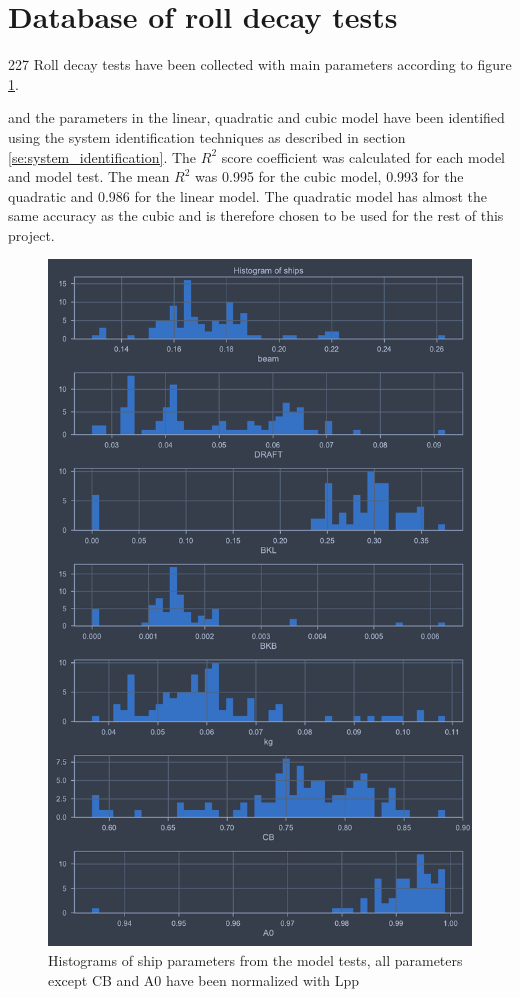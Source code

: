\section{Database of roll decay tests}
\label{se:database_of_roll_decay_tests}

227 Roll decay tests have been collected with main parameters according to figure \ref{fig:ship_parameters}.

and the parameters in the linear, quadratic and cubic model have been identified using the system identification techniques as described in section \ref{se:system_identification}. The $R^2$ score coefficient was calculated for each model and model test. The mean $R^2$ was 0.995 for the cubic model, 0.993 for the quadratic and 0.986 for the linear model. The quadratic model has almost the same accuracy as the cubic and is therefore chosen to be used for the rest of this project.   


\begin{figure}[H]
    \centering
    \includegraphics[width=0.9\columnwidth]{figures/ship_parameters.pdf}
    \caption{Histograms of ship parameters from the model tests, all parameters except CB and A0 have been normalized with Lpp}
    \label{fig:ship_parameters}
\end{figure}